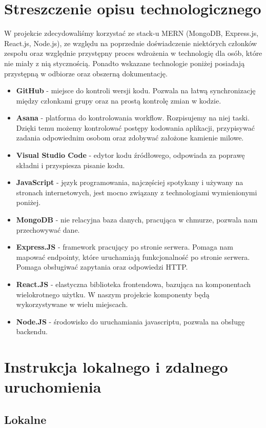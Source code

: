 \documentclass{article}
\begin{document}
    \section{Streszczenie opisu technologicznego}
    W projekcie zdecydowaliśmy korzystać ze stack-u MERN (MongoDB, Express.js, React.js, Node.js), ze względu na poprzednie doświadczenie niektórych członków zespołu oraz względnie przystępny proces wdrożenia w technologię dla osób, które nie miały z nią stycznością. Ponadto wskazane technologie poniżej posiadają przystępną w odbiorze oraz obszerną dokumentację.
    \begin{itemize}
        \item \textbf{GitHub} - miejsce do kontroli wersji kodu. Pozwala na łatwą synchronizację między członkami grupy oraz na prostą kontrolę zmian w kodzie.
        \item \textbf{Asana} - platforma do kontrolowania workflow. Rozpisujemy na niej taski. Dzięki temu możemy kontrolować postępy kodowania aplikacji, przypisywać zadania odpowiednim osobom oraz zdobywać założone kamienie milowe.
        \item \textbf{Visual Studio Code} - edytor kodu źródłowego, odpowiada za poprawę składni i przyspiesza pisanie kodu.
        \item \textbf{JavaScript} - język programowania, najczęściej spotykany i używany na stronach internetowych, jest mocno związany z technologiami wymienionymi poniżej. 
        \item \textbf{MongoDB} - nie relacyjna baza danych, pracująca w chmurze, pozwala nam przechowywać dane.
        \item \textbf{Express.JS} - framework pracujący po stronie serwera. Pomaga nam mapować endpointy, które uruchamiają funkcjonalność po stronie serwera. Pomaga obsługiwać zapytania oraz odpowiedzi HTTP.
        \item \textbf{React.JS} - elastyczna biblioteka frontendowa, bazująca na komponentach wielokrotnego użytku. W naszym projekcie komponenty będą wykorzystywane w wielu miejscach. 
        \item \textbf{Node.JS} - środowisko do uruchamiania javascriptu, pozwala na obsługę backendu.
    \end{itemize}

    \section{Instrukcja lokalnego i zdalnego uruchomienia}
        \subsection{Lokalne}
\end{document}
